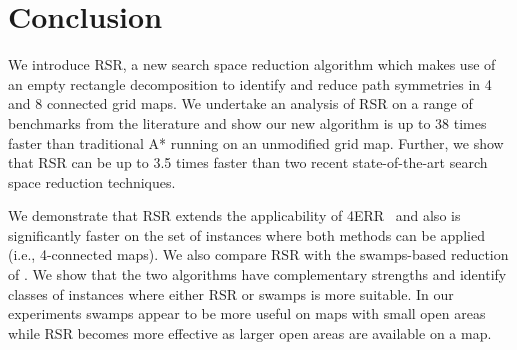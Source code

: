 \section{Conclusion}
We introduce RSR, a new search space reduction algorithm which makes use of an
empty rectangle decomposition to identify and reduce path symmetries in
4 and 8 connected grid maps.  We undertake an analysis of RSR on a range of
benchmarks from the literature and show our new algorithm is up to 38 times
faster than traditional A* running on an unmodified grid map.  Further, we show
that RSR can be up to 3.5 times faster than two recent state-of-the-art search
space reduction techniques.
\par
We demonstrate that RSR extends the applicability of 4ERR~\cite{harabor10}
and also is
significantly faster on the set of instances where both methods can be applied
(i.e., 4-connected maps).  We also compare RSR with the swamps-based reduction
of \cite{pochter10}.  We show that the two
algorithms have complementary strengths and identify classes of instances where
either RSR or swamps is more suitable.  In our experiments swamps appear to be
more useful on maps with small open areas while RSR becomes more effective as
larger open areas are available on a map.
\par



